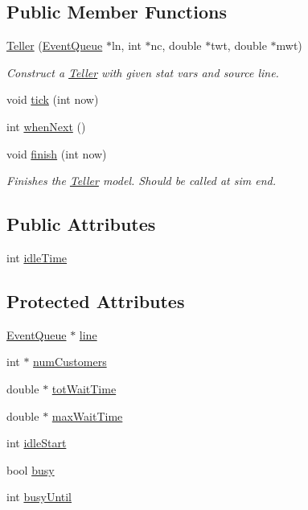 \subsection*{Public Member Functions}
\begin{DoxyCompactItemize}
\item 
\hyperlink{class_teller_ad4e81dd3ee7aa9fec8464e97754a89f2}{Teller} (\hyperlink{class_event_queue}{Event\+Queue} $\ast$ln, int $\ast$nc, double $\ast$twt, double $\ast$mwt)
\begin{DoxyCompactList}\small\item\em Construct a \hyperlink{class_teller}{Teller} with given stat vars and source line. \end{DoxyCompactList}\item 
void \hyperlink{class_teller_aa8cf7bb201a88b959b42a3c4358565c3}{tick} (int now)
\item 
int \hyperlink{class_teller_a10106b3a286c21870bde1751aec0f9b6}{when\+Next} ()
\item 
void \hyperlink{class_teller_aaedc2bff64e9223f295cf9f05226b12e}{finish} (int now)
\begin{DoxyCompactList}\small\item\em Finishes the \hyperlink{class_teller}{Teller} model. Should be called at sim end. \end{DoxyCompactList}\end{DoxyCompactItemize}
\subsection*{Public Attributes}
\begin{DoxyCompactItemize}
\item 
int \hyperlink{class_teller_a09db98c5db957cd1937b3b5e9fa2820b}{idle\+Time}
\end{DoxyCompactItemize}
\subsection*{Protected Attributes}
\begin{DoxyCompactItemize}
\item 
\hyperlink{class_event_queue}{Event\+Queue} $\ast$ \hyperlink{class_teller_ad43bf4c0eeee493a6dce005ba95527a4}{line}
\item 
int $\ast$ \hyperlink{class_teller_aeb31b3f7b01ecc86be2aecf9899d29cd}{num\+Customers}
\item 
double $\ast$ \hyperlink{class_teller_a0fe70e6fab108e4f1f478835d0856b38}{tot\+Wait\+Time}
\item 
double $\ast$ \hyperlink{class_teller_af14fc15803a686d5a4a94e5538f15077}{max\+Wait\+Time}
\item 
int \hyperlink{class_teller_a7b9a77eab83010cba4e56ec487c90f9a}{idle\+Start}
\item 
bool \hyperlink{class_teller_a755cb7ba947e09ef875201bdaa38736e}{busy}
\item 
int \hyperlink{class_teller_a7ca8b1718a8dfcc84c300496430981af}{busy\+Until}
\end{DoxyCompactItemize}


